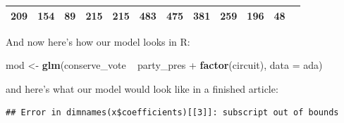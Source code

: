\documentclass[12pt,twoside]{article}
\newenvironment{Shaded}{}{}
\newcommand{\KeywordTok}[1]{\textcolor[rgb]{0.00,0.44,0.13}{\textbf{{#1}}}}
\newcommand{\DataTypeTok}[1]{\textcolor[rgb]{0.56,0.13,0.00}{{#1}}}
\newcommand{\StringTok}[1]{\textcolor[rgb]{0.25,0.44,0.63}{{#1}}}
\newcommand{\NormalTok}[1]{{#1}}
\begin{document}
\begin{longtable}[c]{@{}cccccccccccc@{}}
\begin{minipage}[t]{0.04\columnwidth}
209
\strut\end{minipage} &
\begin{minipage}[t]{0.04\columnwidth}\centering\strut
154
\strut\end{minipage} &
\begin{minipage}[t]{0.04\columnwidth}\centering\strut
89
\strut\end{minipage} &
\begin{minipage}[t]{0.04\columnwidth}\centering\strut
215
\strut\end{minipage} &
\begin{minipage}[t]{0.04\columnwidth}\centering\strut
215
\strut\end{minipage} &
\begin{minipage}[t]{0.04\columnwidth}\centering\strut
483
\strut\end{minipage} &
\begin{minipage}[t]{0.04\columnwidth}\centering\strut
475
\strut\end{minipage} &
\begin{minipage}[t]{0.04\columnwidth}\centering\strut
381
\strut\end{minipage} &
\begin{minipage}[t]{0.05\columnwidth}\centering\strut
259
\strut\end{minipage} &
\begin{minipage}[t]{0.05\columnwidth}\centering\strut
196
\strut\end{minipage} &
\begin{minipage}[t]{0.05\columnwidth}\centering\strut
48
\strut\end{minipage}\tabularnewline
\bottomrule
\end{longtable}

And now here's how our model looks in R:

\begin{Shaded}
\begin{Highlighting}[]
\NormalTok{mod <-}\StringTok{ }\KeywordTok{glm}\NormalTok{(conserve_vote ~}\StringTok{ }\NormalTok{party_pres +}\StringTok{ }\KeywordTok{factor}\NormalTok{(circuit),}
           \DataTypeTok{data =} \NormalTok{ada)}
\end{Highlighting}
\end{Shaded}

and here's what our model would look like in a finished article:

\begin{verbatim}
## Error in dimnames(x$coefficients)[[3]]: subscript out of bounds
\end{verbatim}
\end{document}
